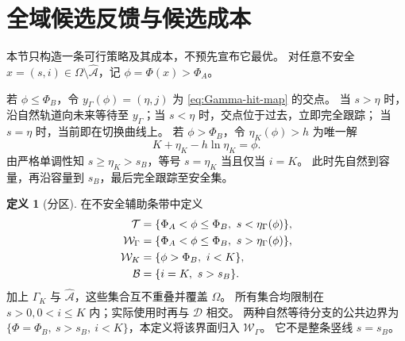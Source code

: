 \documentclass[11pt,a4paper,UTF8]{ctexart}
\theoremstyle{definition}
\newtheorem{definition}[theorem]{定义}
\newcommand{\Acal}{\mathcal A}
\newcommand{\Dcal}{\mathcal D}
\begin{document}
\section{全域候选反馈与候选成本}
\label{sec:synthesis}
本节只构造一条可行策略及其成本，不预先宣布它最优。
对任意不安全 $x=(s,i)\in\Omega\setminus\widehat{\Acal}$，记 $\phi=\Phi(x)>\Phi_A$。

若 $\phi\le\Phi_B$，令 $y_\Gamma(\phi)=(\eta,j)$ 为 \eqref{eq:Gamma-hit-map} 的交点。
当 $s>\eta$ 时，沿自然轨道向未来等待至 $y_\Gamma$；当 $s<\eta$ 时，交点位于过去，立即完全跟踪；
当 $s=\eta$ 时，当前即在切换曲线上。
若 $\phi>\Phi_B$，令 $\eta_K(\phi)>h$ 为唯一解
\begin{equation}
K+\eta_K-h\ln\eta_K=\phi.
\label{eq:capacity-hit-map}
\end{equation}
由严格单调性知 $s\ge\eta_K>s_B$，等号 $s=\eta_K$ 当且仅当 $i=K$。
此时先自然到容量，再沿容量到 $s_B$，最后完全跟踪至安全集。

\begin{definition}[分区]
\label{def:regions}
在不安全辅助条带中定义
\begin{align}
\mathcal T&=\{\Phi_A<\phi\le\Phi_B,\ s<\eta_\Gamma(\phi)\},\notag\\
\mathcal W_\Gamma&=\{\Phi_A<\phi\le\Phi_B,\ s>\eta_\Gamma(\phi)\},\notag\\
\mathcal W_K&=\{\phi>\Phi_B,\ i<K\},\notag\\
\mathcal B&=\{i=K,\ s>s_B\}.\label{eq:regions}
\end{align}
加上 $\Gamma_K$ 与 $\widehat{\Acal}$，这些集合互不重叠并覆盖 $\Omega$。
所有集合均限制在 $s>0,0<i\le K$ 内；实际使用时再与 $\Dcal$ 相交。
两种自然等待分支的公共边界为
$\{\Phi=\Phi_B,\ s>s_B,\ i<K\}$，本定义将该界面归入 $\mathcal W_\Gamma$。
它不是整条竖线 $s=s_B$。
\end{definition}
\end{document}
